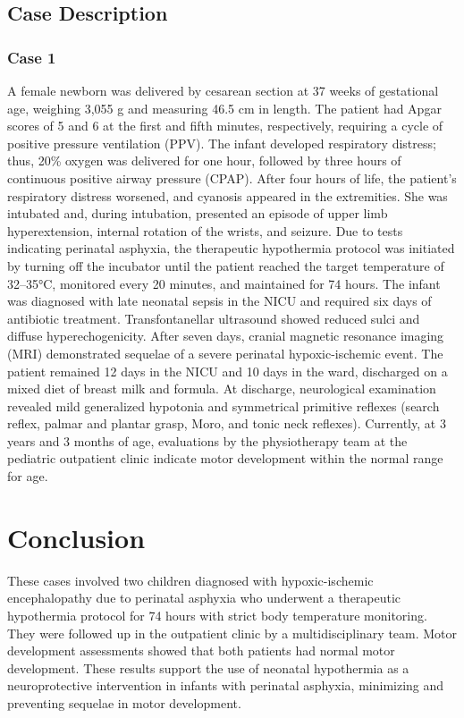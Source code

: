 \documentclass[11pt,a4paper]{article}
\begin{document}
	\subsection{Case Description}
	\subsubsection{Case 1}
	A female newborn was delivered by cesarean section at 37 weeks of gestational age, weighing 3,055 g and measuring 46.5 cm in length. The patient had Apgar scores of 5 and 6 at the first and fifth minutes, respectively, requiring a cycle of positive pressure ventilation (PPV). The infant developed respiratory distress; thus, 20\% oxygen was delivered for one hour, followed by three hours of continuous positive airway pressure (CPAP). After four hours of life, the patient’s respiratory distress worsened, and cyanosis appeared in the extremities. She was intubated and, during intubation, presented an episode of upper limb hyperextension, internal rotation of the wrists, and seizure.
	Due to tests indicating perinatal asphyxia, the therapeutic hypothermia protocol was initiated by turning off the incubator until the patient reached the target temperature of 32–35°C, monitored every 20 minutes, and maintained for 74 hours. The infant was diagnosed with late neonatal sepsis in the NICU and required six days of antibiotic treatment. Transfontanellar ultrasound showed reduced sulci and diffuse hyperechogenicity. After seven days, cranial magnetic resonance imaging (MRI) demonstrated sequelae of a severe perinatal hypoxic-ischemic event. The patient remained 12 days in the NICU and 10 days in the ward, discharged on a mixed diet of breast milk and formula.
	At discharge, neurological examination revealed mild generalized hypotonia and symmetrical primitive reflexes (search reflex, palmar and plantar grasp, Moro, and tonic neck reflexes). Currently, at 3 years and 3 months of age, evaluations by the physiotherapy team at the pediatric outpatient clinic indicate motor development within the normal range for age.
		
	\section{Conclusion}
	These cases involved two children diagnosed with hypoxic-ischemic encephalopathy due to perinatal asphyxia who underwent a therapeutic hypothermia protocol for 74 hours with strict body temperature monitoring. They were followed up in the outpatient clinic by a multidisciplinary team. Motor development assessments showed that both patients had normal motor development. These results support the use of neonatal hypothermia as a neuroprotective intervention in infants with perinatal asphyxia, minimizing and preventing sequelae in motor development.
	
	\newpage
	
	\printbibliography[title=References]
		
\end{document}
